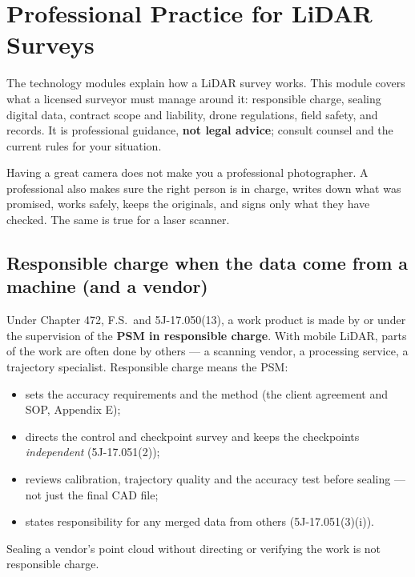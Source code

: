 \chapter{Professional Practice for LiDAR Surveys}

The technology modules explain how a LiDAR survey works. This module covers what a licensed surveyor must manage around it: responsible charge, sealing digital data, contract scope and liability, drone regulations, field safety, and records. It is professional guidance, \textbf{not legal advice}; consult counsel and the current rules for your situation.

\begin{kid}
Having a great camera does not make you a professional photographer. A professional also makes sure the right person is in charge, writes down what was promised, works safely, keeps the originals, and signs only what they have checked. The same is true for a laser scanner.
\end{kid}

\section{Responsible charge when the data come from a machine (and a vendor)}
\begin{eng}
Under Chapter 472, F.S.\ and 5J-17.050(13), a work product is made by or under the supervision of the \textbf{PSM in responsible charge}. With mobile LiDAR, parts of the work are often done by others --- a scanning vendor, a processing service, a trajectory specialist. Responsible charge means the PSM:
\begin{itemize}
\item sets the accuracy requirements and the method (the client agreement and SOP, Appendix E);
\item directs the control and checkpoint survey and keeps the checkpoints \emph{independent} (5J-17.051(2));
\item reviews calibration, trajectory quality and the accuracy test before sealing --- not just the final CAD file;
\item states responsibility for any merged data from others (5J-17.051(3)(i)).
\end{itemize}
Sealing a vendor's point cloud without directing or verifying the work is not responsible charge.
\end{eng}

